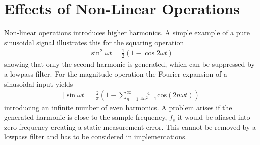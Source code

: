 \documentclass[../main2.tex]{subfiles}
\begin{document}
\section{Effects of Non-Linear Operations} \label{non_lin_ops}
Non-linear operations introduces higher harmonics. A simple example of a pure sinusoidal signal illustrates this for the squaring operation
\begin{align}
\sin^2{\omega t} = \frac{1}{2}(1-\cos{2\omega t}) 
\end{align}
showing that only the second harmonic is generated, which can be suppressed by a lowpass filter.
For the magnitude operation the Fourier expansion of a sinusoidal input yields
\begin{align}
\left |\sin{\omega t}\right | = \frac{2}{\pi}\left (1 - \sum_{n=1}^{\infty}\frac{4}{4n^2-1} \text{cos} (2n\omega t) \right) 
\end{align}
introducing an infinite number of even harmonics. A problem arises if the generated harmonic is close to the sample frequency, $f_s$ it would be aliased into zero frequency creating a static measurement error. This cannot be removed by a lowpass filter and has to be considered in implementations.
\end{document}
